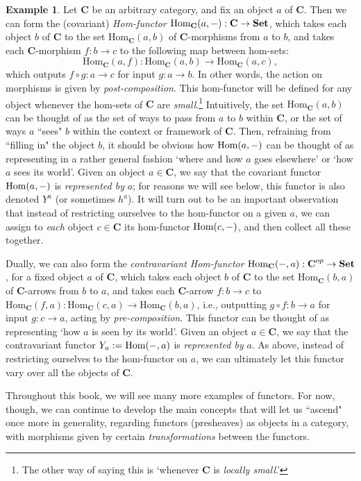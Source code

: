 \documentclass[11pt]{book}
\theoremstyle{definition}
\newtheorem{example}{Example}[section]
\theoremstyle{definition}
\theoremstyle{definition}
\theoremstyle{theorem}
\theoremstyle{definition}
\begin{document}
\begin{example} 
	\label{example: hom-functor}
	Let \textbf{C} be an arbitrary category, and fix an object $a$ of \textbf{C}. Then we can form the (covariant) \textit{Hom-functor} $\text{Hom}_{\textbf{C}}(a,\--): \textbf{C} \rightarrow \textbf{Set}$, which takes each object $b$ of \textbf{C} to the set $\text{Hom}_{\textbf{C}}(a,b)$ of $\textbf{C}$-morphisms from $a$ to $b$, and takes each \textbf{C}-morphism $f: b \rightarrow c$ to the following map between hom-sets: \begin{equation} \text{Hom}_{\textbf{C}}(a,f): \text{Hom}_{\textbf{C}}(a,b) \rightarrow \text{Hom}_{\textbf{C}}(a,c),
	\end{equation} 
	which outputs $f \circ g: a \rightarrow c$ for input $g: a \rightarrow b$. In other words, the action on morphisms is given by \textit{post-composition}. This hom-functor will be defined for any object whenever the hom-sets of $\textbf{C}$ are \textit{small}.\footnote{The other way of saying this is `whenever \textbf{C} is \textit{locally small}.'} Intuitively, the set $\text{Hom}_{\textbf{C}}(a,b)$ can be thought of as the set of ways to pass from $a$ to $b$ within \textbf{C}, or the set of ways $a$ ``sees" $b$ within the context or framework of \textbf{C}. Then, refraining from ``filling in" the object $b$, it should be obvious how $\text{Hom}(a,\--)$ can be thought of as representing in a rather general fashion `where and how $a$ goes elsewhere' or `how $a$ sees its world'. Given an object $a \in \textbf{C}$, we say that the covariant functor $\text{Hom}(a, \--)$ is \textit{represented by} $a$; for reasons we will see below, this functor is also denoted $Y^a$ (or sometimes $h^a$). It will turn out to be an important observation that instead of restricting ourselves to the hom-functor on a given $a$, we can assign to \textit{each} object $c \in \textbf{C}$ its hom-functor $\text{Hom}(c, \--)$, and then collect all these together.\par 
	Dually, we can also form the \textit{contravariant Hom-functor} $\text{Hom}_{\textbf{C}}(\--,a): \textbf{C}^{op} \rightarrow \textbf{Set}$, for a fixed object $a$ of \textbf{C}, which takes each object $b$ of \textbf{C} to the set $\text{Hom}_{\textbf{C}}(b,a)$ of $\textbf{C}$-arrows from $b$ to $a$, and takes each \textbf{C}-arrow $f: b \rightarrow c$ to $\text{Hom}_{\textbf{C}}(f,a): \text{Hom}_{\textbf{C}}(c,a) \rightarrow \text{Hom}_{\textbf{C}}(b,a)$, i.e., outputting $g \circ f: b \rightarrow a$ for input $g: c \rightarrow a$, acting by \textit{pre-composition}. This functor can be thought of as representing `how $a$ is seen by its world'. Given an object $a \in \textbf{C}$, we say that the contravariant functor $Y_a := \text{Hom}(\--,a)$ is \textit{represented by} $a$. As above, instead of restricting ourselves to the hom-functor on $a$, we can ultimately let this functor vary over all the objects of \textbf{C}.
\end{example}
Throughout this book, we will see many more examples of functors. For now, though, we can continue to develop the main concepts that will let us ``ascend" once more in generality, regarding functors (presheaves) as objects in a category, with morphisms given by certain \textit{transformations} between the functors.  
\end{document}

